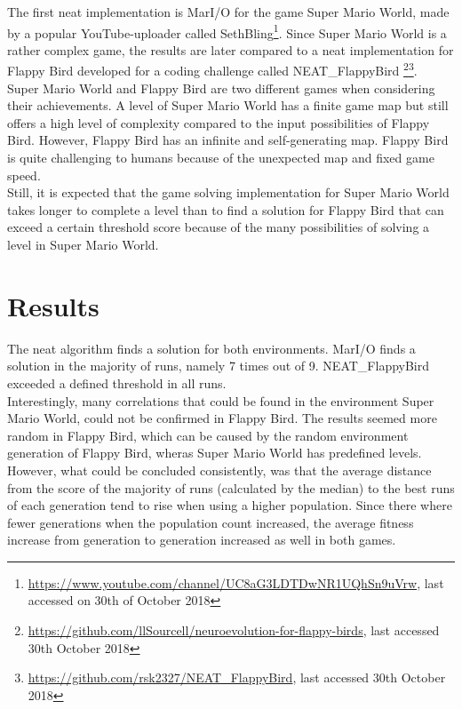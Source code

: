 The first \gls{neat} implementation is MarI/O for the game Super Mario World, made by a popular YouTube-uploader called SethBling\footnote{\url{https://www.youtube.com/channel/UC8aG3LDTDwNR1UQhSn9uVrw}, last accessed on 30th of October 2018}. Since Super Mario World is a rather complex game, the results are later compared to a \gls{neat} implementation for Flappy Bird developed for a coding challenge called NEAT\_FlappyBird \footnote{\url{https://github.com/llSourcell/neuroevolution-for-flappy-birds}, last accessed 30th October 2018}\footnote{\url{https://github.com/rsk2327/NEAT_FlappyBird}, last accessed 30th October 2018}. \\
Super Mario World and Flappy Bird are two different games when considering their achievements. A level of Super Mario World has a finite game map but still offers a high level of complexity compared to the input possibilities of Flappy Bird. However, Flappy Bird has an infinite and self-generating map. Flappy Bird is quite challenging to humans because of the unexpected map and fixed game speed.\\ 
Still, it is expected that the game solving implementation for Super Mario World takes longer to complete a level than to find a solution for Flappy Bird that can exceed a certain threshold score because of the many possibilities of solving a level in Super Mario World.

\section{Results}
\label{sec:intro:results}
The \gls{neat} algorithm finds a solution for both environments. MarI/O finds a solution in the majority of runs, namely 7 times out of 9. NEAT\_FlappyBird exceeded a defined threshold in all runs.\\
Interestingly, many correlations that could be found in the environment Super Mario World, could not be confirmed in Flappy Bird. The results seemed more random in Flappy Bird, which can be caused by the random environment generation of Flappy Bird, wheras Super Mario World has predefined levels.\\
However, what could be concluded consistently, was that the average distance from the score of the majority of runs (calculated by the median) to the best runs of each generation tend to rise when using a higher population. Since there where fewer generations when the population count increased, the average fitness increase from generation to generation increased as well in both games.

%
%
%
%
